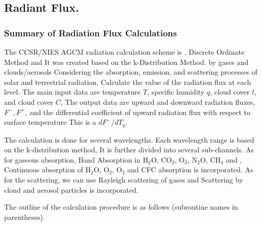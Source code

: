 \hypertarget{radiant-flux.}{%
\subsection{Radiant Flux.}\label{radiant-flux.}}

\hypertarget{summary-of-radiation-flux-calculations}{%
\subsubsection{Summary of Radiation Flux
Calculations}\label{summary-of-radiation-flux-calculations}}

The CCSR/NIES AGCM radiation calculation scheme is , Discrete Ordinate
Method and It was created based on the k-Distribution Method. by gases
and clouds/aerosols Considering the absorption, emission, and scattering
processes of solar and terrestrial radiation, Calculate the value of the
radiation flux at each level. The main input data are temperature \(T\),
specific humidity \(q\), cloud cover \(l\), and cloud cover \(C\), The
output data are upward and downward radiation fluxes, \(F^-, F^+\), and
the differential coefficient of upward radiation flux with respect to
surface temperature This is a \(dF^-/dT_g\).

The calculation is done for several wavelengths. Each wavelength range
is based on the k-distribution method, It is further divided into
several sub-channels. As for gaseous absorption, Band Absorption in
H\(_2\)O, CO\(_2\), O\(_3\), N\(_2\)O, CH\(_4\) and , Continuous
absorption of H\(_2\)O, O\(_2\), O\(_3\) and CFC absorption is
incorporated. As for the scattering, we can use Rayleigh scattering of
gases and Scattering by cloud and aerosol particles is incorporated.

The outline of the calculation procedure is as follows (subroutine names
in parentheses).

